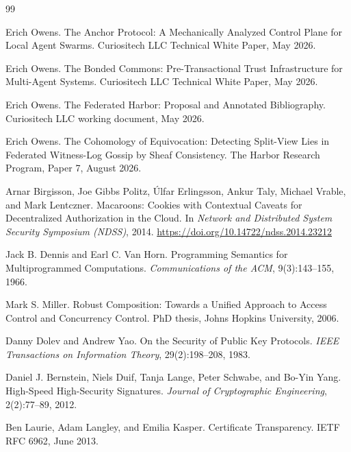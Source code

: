 \documentclass[11pt,a4paper]{article}
\theoremstyle{definition}
\theoremstyle{remark}
\begin{document}

\pdprintsolutions
\begin{thebibliography}{99}

Erich Owens.
\newblock The Anchor Protocol: A Mechanically Analyzed Control Plane for Local Agent Swarms.
\newblock Curiositech LLC Technical White Paper, May 2026.

Erich Owens.
\newblock The Bonded Commons: Pre-Transactional Trust Infrastructure for Multi-Agent Systems.
\newblock Curiositech LLC Technical White Paper, May 2026.

Erich Owens.
\newblock The Federated Harbor: Proposal and Annotated Bibliography.
\newblock Curiositech LLC working document, May 2026.

Erich Owens.
\newblock The Cohomology of Equivocation: Detecting Split-View Lies in Federated Witness-Log Gossip by Sheaf Consistency.
\newblock The Harbor Research Program, Paper 7, August 2026.

Arnar Birgisson, Joe Gibbs Politz, Úlfar Erlingsson, Ankur Taly, Michael Vrable, and Mark Lentczner.
\newblock Macaroons: Cookies with Contextual Caveats for Decentralized Authorization in the Cloud.
\newblock In \textit{Network and Distributed System Security Symposium (NDSS)}, 2014.
\newblock \url{https://doi.org/10.14722/ndss.2014.23212}

Jack B. Dennis and Earl C. Van Horn.
\newblock Programming Semantics for Multiprogrammed Computations.
\newblock \textit{Communications of the ACM}, 9(3):143--155, 1966.

Mark S. Miller.
\newblock Robust Composition: Towards a Unified Approach to Access Control and Concurrency Control.
\newblock PhD thesis, Johns Hopkins University, 2006.

Danny Dolev and Andrew Yao.
\newblock On the Security of Public Key Protocols.
\newblock \textit{IEEE Transactions on Information Theory}, 29(2):198--208, 1983.

Daniel J. Bernstein, Niels Duif, Tanja Lange, Peter Schwabe, and Bo-Yin Yang.
\newblock High-Speed High-Security Signatures.
\newblock \textit{Journal of Cryptographic Engineering}, 2(2):77--89, 2012.

Ben Laurie, Adam Langley, and Emilia Kasper.
\newblock Certificate Transparency.
\newblock IETF RFC 6962, June 2013.


\end{thebibliography}
\end{document}
